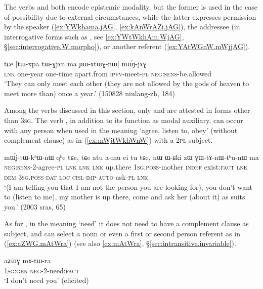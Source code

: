 The verbs  and  both encode epistemic modality, but the former is used in the case of possibility due to external circumstances, while the latter expresses permission by the speaker (\ref{ex:YWkhama.jAG}, \ref{ex:kAnWrAZi.jAG}), the addressee (in interrogative forms such as , see \ref{ex:YWtWkhAm.WjAG}, §\ref{sec:interrogative.W.morpho}), or another referent (\ref{ex:YAtWGnW.mWjjAG}). 


\begin{exe} 
\ex \label{ex:YAtWGnW.mWjjAG}
\gll tɕe [tɯ-xpa tɯ-ɣjɤn ma ɲɯ-ɤtɯɣ-nɯ] mɯ́j-jɤɣ \\
\textsc{lnk} one-year one-time apart.from \textsc{ipfv}-meet-\textsc{pl} \textsc{neg}:\textsc{sens}-be.allowed \\
\glt `They can only meet each other (they are not allowed by the gods of heaven to meet more than) once a year.' (150828 niulang-zh, 184)
\end{exe}

Among the verbs discussed in this section, only  and  are attested in forms other than \textsc{3sg}. The verb , in addition to its function as modal auxiliary, can occur with any person when used in the meaning `agree, listen to, obey' (without complement clause) as in (\ref{ex:mWjtWkhWnW}) with a \textsc{2pl} subject.

\begin{exe} 
\ex \label{ex:mWjtWkhWnW}
\gll mɯ́j-tɯ-kʰɯ-nɯ qʰe tɕe, tɕe atu a-mu ci tu tɕe, nɯ ɯ-ɕki zɯ ɣɯ-tɤ-nɯ-tʰu-nɯ ma \\
\textsc{neg}:\textsc{sens}-2-agree-\textsc{pl} \textsc{lnk} \textsc{lnk} \textsc{lnk} up.there \textsc{1sg}.\textsc{poss}-mother \textsc{indef} exist:\textsc{fact} \textsc{lnk} \textsc{dem} \textsc{3sg}.\textsc{poss}-\textsc{dat} \textsc{loc} \textsc{cisl}-\textsc{imp}-\textsc{auto}-ask-\textsc{pl} \textsc{lnk} \\
\glt `(I am telling you that I am not the person you are looking for), you don't want to (listen to me), my mother is up there, come and ask her (about it) as suits you.' (2003 sras, 65)
\end{exe} 

As for , in the meaning `need' it does not need to have a complement clause as subject, and can select a noun or even a first or second person referent as in (\ref{ex:aZWG.mAtWra}) (see also \ref{ex:mAtWra}, §\ref{sec:intransitive.invariable}).  

\begin{exe} 
\ex \label{ex:aZWG.mAtWra}
\gll  aʑɯɣ mɤ-tɯ-ra \\
 \textsc{1sg}:\textsc{gen} \textsc{neg}-2-need:\textsc{fact} \\
 \glt `I don't need you' (elicited)
\end{exe} 

